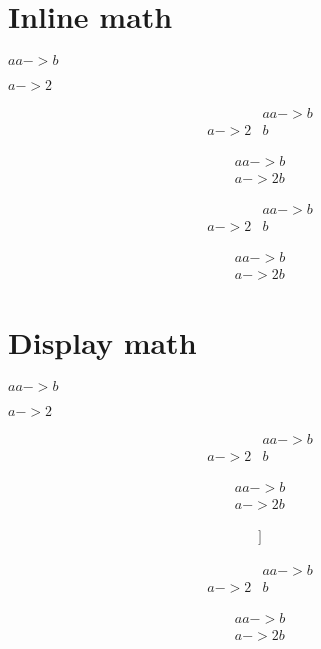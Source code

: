 \documentclass{article}
\begin{document}
\section{Inline math}

\ReMConfigShow
\ReMEnable
\ReMEnable

\par$aa->b$
\par$a->2$

\begin{align*}
    &aa->b\\
    a->2&b
\end{align*}

\begin{gather}
    aa->b\\
    a->2b
\end{gather}

\ReMDisable
\ReMDisable

\begin{align*}
    &aa->b\\
    a->2&b
\end{align*}

\begin{gather}
    aa->b\\
    a->2b
\end{gather}


\section{Display math}

\ReMConfigAddRe{]]}{\c{end}{bmatrix}}
\ReMConfigShow

\ReMEnable

\par$aa->b$
\par$a->2$

\begin{align*}
    &aa->b\\
    a->2&b
\end{align*}

\begin{gather}
    aa->b\\
    a->2b
\end{gather}


\begin{align*}
    [[ a & b \\ c & d ]]
\end{align*}


\ReMDisable

\begin{align*}
    &aa->b\\
    a->2&b
\end{align*}

\begin{gather}
    aa->b\\
    a->2b
\end{gather}
\end{document}
